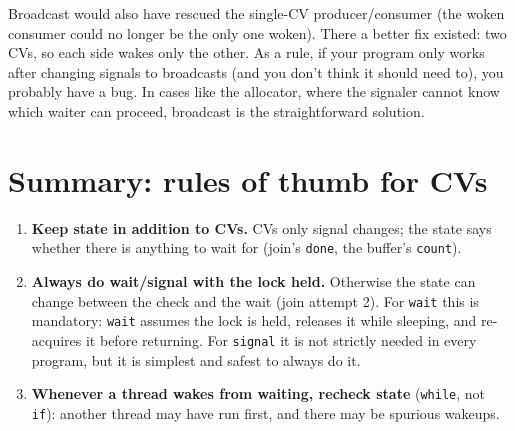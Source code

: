 \documentclass[11pt,a4paper]{article}
\begin{document}
\begin{warnbox}
Broadcast would also have rescued the single-CV producer/consumer (the
woken consumer could no longer be the only one woken). There a better fix
existed: two CVs, so each side wakes only the other. As a rule, if your
program only works after changing signals to broadcasts (and you don't
think it should need to), you probably have a bug. In cases like the
allocator, where the signaler cannot know which waiter can proceed,
broadcast is the straightforward solution.
\end{warnbox}

\section{Summary: rules of thumb for CVs}

\begin{keybox}
\begin{enumerate}
  \item \textbf{Keep state in addition to CVs.} CVs only signal changes; the
        state says whether there is anything to wait for (join's
        \texttt{done}, the buffer's \texttt{count}).
  \item \textbf{Always do wait/signal with the lock held.} Otherwise the
        state can change between the check and the wait (join attempt 2).
        For \texttt{wait} this is mandatory: \texttt{wait} assumes the lock
        is held, releases it while sleeping, and re-acquires it before
        returning. For \texttt{signal} it is not strictly needed in every
        program, but it is simplest and safest to always do it.
  \item \textbf{Whenever a thread wakes from waiting, recheck state}
        (\texttt{while}, not \texttt{if}): another thread may have run
        first, and there may be spurious wakeups.
\end{enumerate}
\end{keybox}
\end{document}
